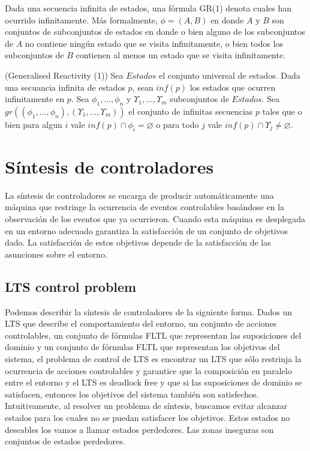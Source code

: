 Dada una secuencia infinita de estados, una fórmula GR(1) \cite{SRD} denota cuales han ocurrido infinitamente. 
Más formalmente, $\phi = (A, B)$ en donde $A$ y $B$ son conjuntos de subconjuntos de estados en donde o bien alguno de los 
subconjuntos de $A$ no contiene ningún estado que se visita infinitamente, o bien todos los subconjuntos de $B$ contienen 
al menos un estado que se visita infinitamente.

\begin{definition}{(Generalised Reactivity (1))}
Sea $Estados$ el conjunto universal de estados. Dada una secuancia infinita de estados $p$, sean $inf(p)$ los estados que 
ocurren infinitamente en $p$. Sea $\phi_{1}, ..., \phi_{n}$ y $\varUpsilon_{1}, ..., \varUpsilon_{m}$ subconjuntos de $Estados$. Sea\\ 
$gr((\phi_{1}, ..., \phi_{n}), (\varUpsilon_{1}, ..., \varUpsilon_{m}))$ el conjunto de infinitas secuencias $p$ tales que 
o bien para algun $i$ vale $inf(p)\cap\phi_{i} = \varnothing$ o para todo $j$ vale $inf(p)\cap\varUpsilon_{j} \neq \varnothing$.
\end{definition}

\section{Síntesis de controladores}

La síntesis de controladores se encarga de producir automáticamente una máquina que restringe la ocurrencia de eventos 
controlables basándose en la observación de los eventos que ya ocurrieron. Cuando esta máquina es desplegada en un entorno 
adecuado garantiza la satisfacción de un conjunto de objetivos dado. La satisfacción de estos objetivos depende de la 
satisfacción de las asunciones sobre el entorno.

\subsection{LTS control problem}

Podemos describir la síntesis de controladores de la siguiente forma. Dados un LTS que describe el comportamiento 
del entorno, un conjunto de acciones controlables, un conjunto de fórmulas FLTL que representan las suposiciones 
del dominio y un conjunto de fórmulas FLTL que representan los objetivos del sistema, el problema de control de 
LTS \cite{LTSControl} es encontrar un LTS que sólo restrinja la ocurrencia de acciones controlables y garantice que la composición 
en paralelo entre el entorno y el LTS es deadlock free y que si las suposiciones de dominio se satisfacen, entonces 
los objetivos del sistema también son satisfechos. Intuitivamente, al resolver un problema de síntesis, buscamos evitar alcanzar 
estados para los cuales no se puedan satisfacer los objetivos. Estos estados no deseables los vamos a llamar estados perdedores. 
Las zonas inseguras son conjuntos de estados perdedores.


